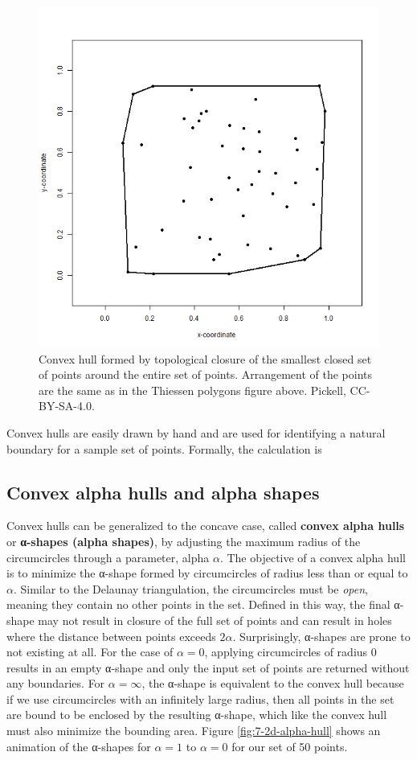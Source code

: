 \documentclass[
]{book}
\begin{document}
\begin{figure}
\includegraphics[width=0.75\linewidth]{images/07-2d-convex-hull} \caption{Convex hull formed by topological closure of the smallest closed set of points around the entire set of points. Arrangement of the points are the same as in the Thiessen polygons figure above. Pickell, CC-BY-SA-4.0.}\label{fig:7-2d-convex-hull}
\end{figure}

Convex hulls are easily drawn by hand and are used for identifying a natural boundary for a sample set of points. Formally, the calculation is

\hypertarget{convex-alpha-hulls-and-alpha-shapes}{%
\subsection{Convex alpha hulls and alpha shapes}\label{convex-alpha-hulls-and-alpha-shapes}}

Convex hulls can be generalized to the concave case, called \textbf{convex alpha hulls} or \textbf{α-shapes (alpha shapes)}, by adjusting the maximum radius of the circumcircles through a parameter, alpha \(α\). The objective of a convex alpha hull is to minimize the α-shape formed by circumcircles of radius less than or equal to \(α\). Similar to the Delaunay triangulation, the circumcircles must be \emph{open}, meaning they contain no other points in the set. Defined in this way, the final α-shape may not result in closure of the full set of points and can result in holes where the distance between points exceeds \(2α\). Surprisingly, α-shapes are prone to not existing at all. For the case of \(α=0\), applying circumcircles of radius 0 results in an empty α-shape and only the input set of points are returned without any boundaries. For \(α=∞\), the α-shape is equivalent to the convex hull because if we use circumcircles with an infinitely large radius, then all points in the set are bound to be enclosed by the resulting α-shape, which like the convex hull must also minimize the bounding area. Figure \ref{fig:7-2d-alpha-hull} shows an animation of the α-shapes for \(α=1\) to \(α=0\) for our set of 50 points.
\end{document}
